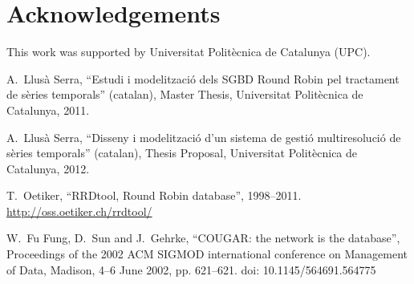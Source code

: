 \documentclass{scrartcl}
\begin{document}
\section*{Acknowledgements}

This work was supported by Universitat Polit\`{e}cnica de Catalunya (UPC).




\begin{thebibliography}{99}


 A.\ Llusà Serra, ``Estudi i modelització
  dels SGBD Round Robin pel tractament de sèries temporals''
  (catalan), Master Thesis, Universitat Politècnica de Catalunya,
  2011. 

 A.\ Llusà Serra, ``Disseny i modelització
  d'un sistema de gestió multiresolució de sèries temporals''
  (catalan), Thesis Proposal, Universitat Politècnica de Catalunya,
  2012. 


 T.\ Oetiker, ``RRDtool, Round Robin database'',
  1998--2011.  \url{http://oss.oetiker.ch/rrdtool/}


 W.\ Fu Fung, D.\ Sun and J.\ Gehrke, ``COUGAR: the
  network is the database'', Proceedings of the 2002 ACM SIGMOD
  international conference on Management of Data, Madison, 4--6 June
  2002, pp. 621--621. doi: 10.1145/564691.564775



\end{thebibliography}
\end{document}

